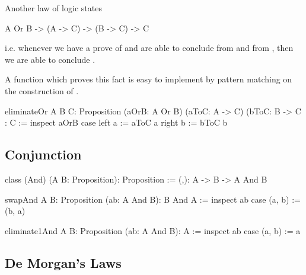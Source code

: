 \noindent Another law of logic states
\begin{alba}
    A Or B  ->  (A -> C) -> (B -> C)  ->  C
\end{alba}
%
i.e. whenever we have a prove of  and are able to conclude
 from  and  from , then we are able to
conclude .

A function which proves this fact is easy to implement by pattern matching on
the construction of .

\begin{alba}
    eliminateOr
        {A B C: Proposition}
        (aOrB: A Or B)
        (aToC: A -> C)
        (bToC: B -> C
        : C
    :=
        inspect aOrB case
            left a  := aToC a
            right b := bToC b
\end{alba}










\subsection{Conjunction}

\begin{alba}
    class
        (And) (A B: Proposition): Proposition
    :=
        (,): A -> B -> A And B
\end{alba}


\begin{alba}
    swapAnd {A B: Proposition} (ab: A And B): B And A
    :=
        inspect ab case
            (a, b) := (b, a)
\end{alba}




\begin{alba}
    eliminate1And {A B: Proposition} (ab: A And B): A :=
        inspect ab case
            (a, b) := a
\end{alba}








\vskip 5mm
\subsection{De Morgan's Laws}

